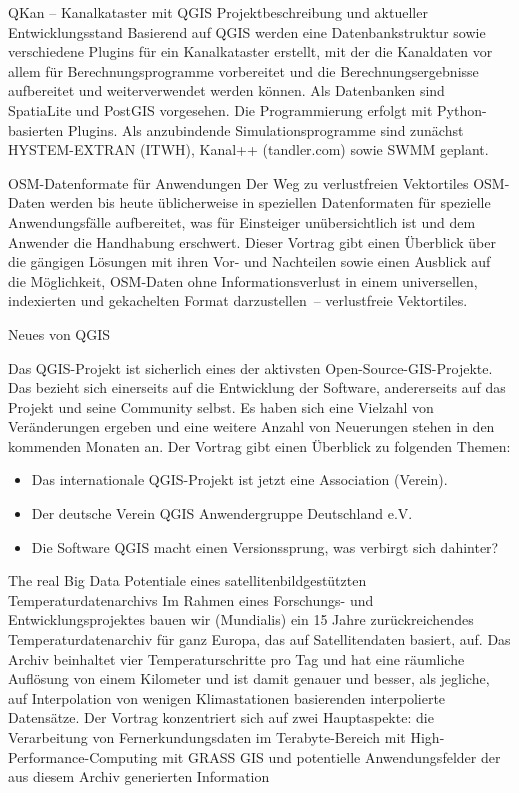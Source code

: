 %
{QKan -- Kanalkataster mit QGIS}%
{Projektbeschreibung und aktueller Entwicklungsstand}%
{Basierend auf QGIS werden eine Datenbankstruktur sowie verschiedene Plugins für ein Kanalkataster
erstellt, mit der die Kanaldaten vor allem für Berechnungsprogramme vorbereitet und die
Berechnungsergebnisse aufbereitet und weiterverwendet werden können. Als Datenbanken sind SpatiaLite
und PostGIS vorgesehen. Die Programmierung erfolgt mit Python-basierten Plugins. Als anzubindende
Simulationsprogramme sind zunächst HYSTEM-EXTRAN (ITWH), Kanal++ (tandler.com) sowie SWMM geplant.}

%
{OSM-Datenformate für Anwendungen}%
{Der Weg zu verlustfreien Vektortiles}%
{OSM-Daten werden bis heute üblicherweise in speziellen Datenformaten für spezielle Anwendungsfälle
aufbereitet, was für Einsteiger unübersichtlich ist und dem Anwender die Handhabung erschwert.
Dieser Vortrag gibt einen Überblick über die gängigen Lösungen mit ihren Vor- und Nachteilen sowie
einen Ausblick auf die Möglichkeit, OSM-Daten ohne Informationsverlust in einem universellen,
indexierten und gekachelten Format darzustellen~-- verlustfreie Vektortiles.}

%
{Neues von QGIS}%
{}%
{Das QGIS-Projekt ist sicherlich eines der aktivsten Open-Source-GIS-Projekte.
Das bezieht sich einerseits auf die Entwicklung der Software,
andererseits auf das Projekt und seine Community selbst. Es haben sich eine
Vielzahl von Veränderungen ergeben und eine weitere Anzahl von Neuerungen
stehen in den kommenden Monaten an. Der Vortrag gibt einen Überblick zu folgenden Themen:
\begin{itemize}\setlength\itemsep{-1pt}
\item Das internationale QGIS-Projekt ist jetzt eine Association (Verein).
\item Der deutsche Verein QGIS Anwendergruppe Deutschland e.V.
\item Die Software QGIS macht einen Versionssprung, was verbirgt sich dahinter?
\end{itemize}%
}

%
{The real Big Data}
{Potentiale eines satellitenbildgestützten Temperaturdatenarchivs}%
{Im Rahmen eines Forschungs- und Entwicklungsprojektes bauen wir (Mundialis) ein 15 Jahre
  zurückreichendes Temperaturdatenarchiv für ganz Europa, das auf Satellitendaten basiert, auf.
  Das Archiv beinhaltet vier Temperaturschritte pro Tag und hat eine räumliche Auflösung von einem
  Kilometer und ist damit genauer und besser, als jegliche, auf Interpolation von wenigen
  Klimastationen basierenden interpolierte Datensätze.
  Der Vortrag konzentriert sich auf zwei Hauptaspekte: die
  Verarbeitung von Fernerkundungsdaten im Terabyte-Bereich mit High-Performance-Computing mit
  GRASS GIS und potentielle Anwendungsfelder der aus diesem Archiv generierten Information}

